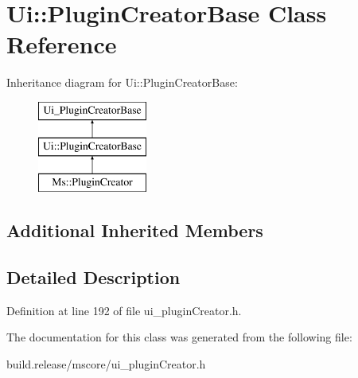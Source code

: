 \hypertarget{class_ui_1_1_plugin_creator_base}{}\section{Ui\+:\+:Plugin\+Creator\+Base Class Reference}
\label{class_ui_1_1_plugin_creator_base}
Inheritance diagram for Ui\+:\+:Plugin\+Creator\+Base\+:\begin{figure}[H]
\begin{center}
\leavevmode
\includegraphics[height=3.000000cm]{class_ui_1_1_plugin_creator_base}
\end{center}
\end{figure}
\subsection*{Additional Inherited Members}


\subsection{Detailed Description}


Definition at line 192 of file ui\+\_\+plugin\+Creator.\+h.



The documentation for this class was generated from the following file\+:\begin{DoxyCompactItemize}
\item 
build.\+release/mscore/ui\+\_\+plugin\+Creator.\+h\end{DoxyCompactItemize}
